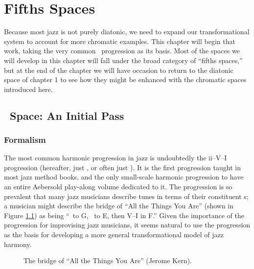 
\chapter{Fifths Spaces}

%
%
Because most jazz is not purely diatonic, we need to expand our
transformational system to account for more chromatic examples. This chapter
will begin that work, taking the very common \tfo\ progression as its basis.
Most of the spaces we will develop in this chapter will fall under the broad
category of “fifths spaces,” but at the end of the chapter we will have
occasion to return to the diatonic space of chapter 1 to see how they might be
enhanced with the chromatic spaces introduced here.

\section{\tf\ Space: An Initial Pass}
\label{sec:tf-space-1}

\subsection{Formalism}

The most common harmonic progression in jazz is undoubtedly the
\mbox{ii--V--I} progression (hereafter, just \tfo, or
often just \tf). It is the first progression taught in most jazz method books,
and the only small-scale harmonic progression to have an entire Aebersold
play-along volume dedicated to it. The progression is so prevalent
that many jazz musicians describe tunes in terms of their constituent \tf{}s;
a musician might describe the bridge of “All the Things You Are” (shown in
Figure \ref{tf:all-things-bridge}) as being “\tf\ to G, \tf\ to E, then V--I
in F.” Given the importance of the progression for improvising jazz
musicians, it seems natural to use the progression as the basis for developing
a more general transformational model of jazz harmony.

\begin{figure}[tbp]
  \caption{The bridge of “All the Things You Are” (Jerome Kern).}
  \label{tf:all-things-bridge}
\end{figure}

